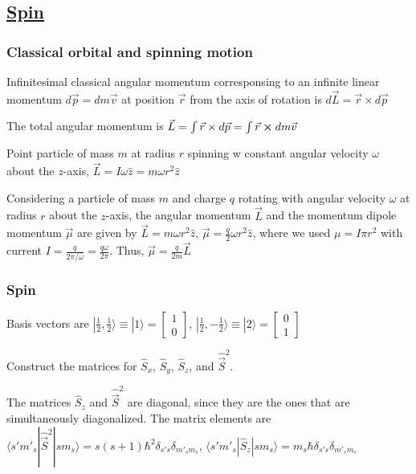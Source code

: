 \subsection{\underline{Spin}}

\subsubsection{Classical orbital and spinning motion}

Infinitesimal classical angular momentum corresponsing to an infinite linear momentum $d \vec{p} = d m \vec{v}$ at position $\vec{r}$ from the axis of rotation is $d \vec{L} = \vec{r} \times d \vec{p}$

The total angular momentum is $\vec{L} = \int \vec{r} \times d \vec{p} = \int \vec{r} \cross d m \vec{v}$

Point particle of mass $m$ at radius $r$ spinning w constant angular velocity $\omega$ about the $z$-axis, $\vec{L} = I \omega \widehat{z} = m \omega r^2 \widehat{z}$

Considering a particle of mass $m$ and charge $q$ rotating with angular velocity $\omega$ at radius $r$ about the $z$-axis, the angular momentum $\vec{L}$ and the momentum dipole momentum $\vec{\mu}$ are given by $\vec{L} = m \omega r^2 \widehat{z}$, $\vec{\mu} = \frac{q}{2} \omega r^2 \widehat{z}$, where we used $\mu = I \pi r^2$ with current $I = \frac{q}{2 \pi / \omega} = \frac{q \omega}{2 \pi}$. Thus, $\vec{\mu} = \frac{q}{2m} \vec{L}$

\subsubsection{Spin} \hfill

Basis vectors are $| \frac{1}{2}, \frac{1}{2} \rangle \equiv | 1 \rangle = \begin{bmatrix} 1 \\ 0 \end{bmatrix}$, $| \frac{1}{2}, -\frac{1}{2} \rangle \equiv | 2 \rangle = \begin{bmatrix} 0 \\ 1 \end{bmatrix}$

Construct the matrices for $\widehat{S}_x$, $\widehat{S}_y$, $\widehat{S}_z$, and $\widehat{\vec{S}}^2$. 

The matrices $\widehat{S}_z$ and $\widehat{\vec{S}}^2$ are diagonal, since they are the ones that are simultaneously diagonalized. The matrix elements are $\langle s' m'_s | \widehat{\vec{S}}^2 | sm_s \rangle = s(s+1) \hbar^2 \delta_{s' s} \delta_{m'_s m_s}$, $\langle s' m'_s | \widehat{S}_z | sm_s \rangle = m_s \hbar \delta_{s' s} \delta_{m'_s m_s}$

